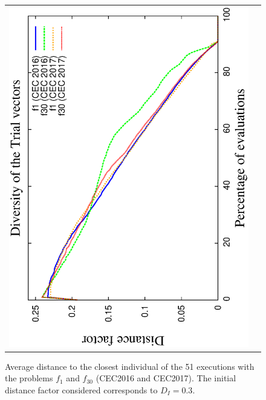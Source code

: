 \begin{figure}[t]
\begin{tabular}{cc}
   \includegraphics[scale=0.25, angle=-90]{img/Diversity_Trial.eps} 
\end{tabular}
\caption{ Average distance to the closest individual of the 51 executions with the problems $f_1$ and $f_{30}$ (CEC2016 and CEC2017). The initial distance factor considered corresponds to $D_I=0.3$.}
\label{fig:one}
\end{figure}


